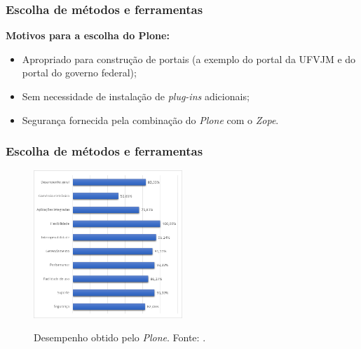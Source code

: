 \documentclass{beamer}
\begin{document}
\begin{frame}
    \frametitle{Escolha de métodos e ferramentas}
    \textbf{Motivos para a escolha do Plone:}
    \begin{itemize}
        \item Apropriado para construção de portais (a exemplo do portal da UFVJM e do portal do governo federal);
        \item Sem necessidade de instalação de \textit{plug-ins} adicionais; %
        \item Segurança fornecida pela combinação do \textit{Plone} com o \textit{Zope}. %
    \end{itemize}
\end{frame}


\begin{frame}
    \frametitle{Escolha de métodos e ferramentas}
    
    \begin{figure}[htb]
        \centering
        \caption{Desempenho obtido pelo \textit{Plone}. Fonte: \cite{elias}.}
        \includegraphics[width=0.5\textwidth]{../figuras/desempenho-plone}
        \label{plone}
    
    \end{figure}
    
\end{frame}
\end{document}

